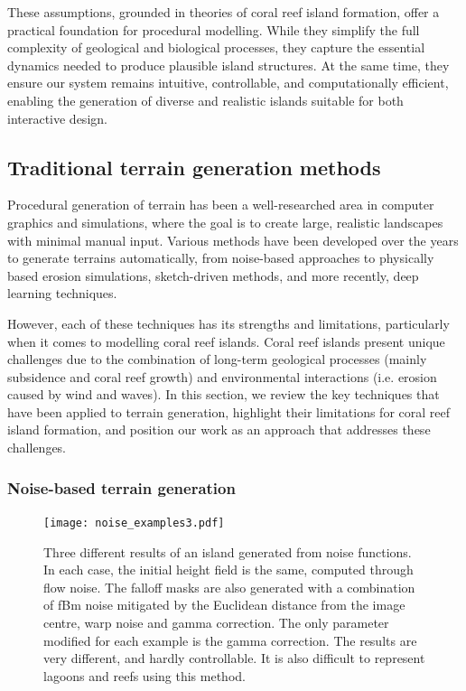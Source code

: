 These assumptions, grounded in theories of coral reef island formation, offer a practical foundation for procedural modelling. While they simplify the full complexity of geological and biological processes, they capture the essential dynamics needed to produce plausible island structures. At the same time, they ensure our system remains intuitive, controllable, and computationally efficient, enabling the generation of diverse and realistic islands suitable for both interactive design.





\subsection{Traditional terrain generation methods}
\label{sec:coral-island-sota-traditional}

Procedural generation of terrain has been a well-researched area in computer graphics and simulations, where the goal is to create large, realistic landscapes with minimal manual input. Various methods have been developed over the years to generate terrains automatically, from noise-based approaches to physically based erosion simulations, sketch-driven methods, and more recently, deep learning techniques.

However, each of these techniques has its strengths and limitations, particularly when it comes to modelling coral reef islands. Coral reef islands present unique challenges due to the combination of long-term geological processes (mainly subsidence and coral reef growth) and environmental interactions (i.e. erosion caused by wind and waves). In this section, we review the key techniques that have been applied to terrain generation, highlight their limitations for coral reef island formation, and position our work as an approach that addresses these challenges.

\subsubsection{Noise-based terrain generation}

\begin{figure}
    \texttt{[image: noise\_examples3.pdf]}
    \caption{Three different results of an island generated from noise functions. In each case, the initial height field is the same, computed through flow noise. The falloff masks are also generated with a combination of fBm noise mitigated by the Euclidean distance from the image centre, warp noise and gamma correction. The only parameter modified for each example is the gamma correction. The results are very different, and hardly controllable. It is also difficult to represent lagoons and reefs using this method.}
    \label{fig:coral-island-noise-example}
\end{figure}

